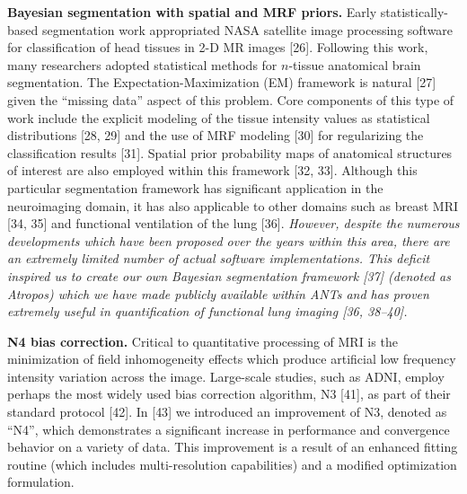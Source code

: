 \documentclass[11pt,]{article}
\begin{document}
\textbf{Bayesian segmentation with spatial and MRF priors.} Early
statistically-based segmentation work appropriated NASA satellite image
processing software for classification of head tissues in 2-D MR images
{[}26{]}. Following this work, many researchers adopted statistical
methods for $n$-tissue anatomical brain segmentation. The
Expectation-Maximization (EM) framework is natural {[}27{]} given the
``missing data'' aspect of this problem. Core components of this type of
work include the explicit modeling of the tissue intensity values as
statistical distributions {[}28, 29{]} and the use of MRF modeling
{[}30{]} for regularizing the classification results {[}31{]}. Spatial
prior probability maps of anatomical structures of interest are also
employed within this framework {[}32, 33{]}. Although this particular
segmentation framework has significant application in the neuroimaging
domain, it has also applicable to other domains such as breast MRI
{[}34, 35{]} and functional ventilation of the lung {[}36{]}.
\emph{However, despite the numerous developments which have been
proposed over the years within this area, there are an extremely limited
number of actual software implementations. This deficit inspired us to
create our own Bayesian segmentation framework {[}37{]} (denoted as
Atropos) which we have made publicly available within ANTs and has
proven extremely useful in quantification of functional lung imaging
{[}36, 38--40{]}.}

\textbf{N4 bias correction.} Critical to quantitative processing of MRI
is the minimization of field inhomogeneity effects which produce
artificial low frequency intensity variation across the image.
Large-scale studies, such as ADNI, employ perhaps the most widely used
bias correction algorithm, N3 {[}41{]}, as part of their standard
protocol {[}42{]}. In {[}43{]} we introduced an improvement of N3,
denoted as ``N4'', which demonstrates a significant increase in
performance and convergence behavior on a variety of data. This
improvement is a result of an enhanced fitting routine (which includes
multi-resolution capabilities) and a modified optimization formulation.
\end{document}

